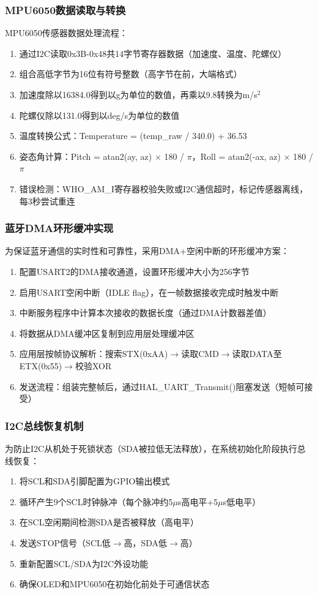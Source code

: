 \subsubsection{MPU6050数据读取与转换}
MPU6050传感器数据处理流程：
\begin{enumerate}
    \item 通过I2C读取0x3B-0x48共14字节寄存器数据（加速度、温度、陀螺仪）
    \item 组合高低字节为16位有符号整数（高字节在前，大端格式）
    \item 加速度除以16384.0得到以g为单位的数值，再乘以9.8转换为m/s$^2$
    \item 陀螺仪除以131.0得到以deg/s为单位的数值
    \item 温度转换公式：Temperature = (temp\_raw / 340.0) + 36.53
    \item 姿态角计算：Pitch = atan2(ay, az) $\times$ 180 / $\pi$，Roll = atan2(-ax, az) $\times$ 180 / $\pi$
    \item 错误检测：WHO\_AM\_I寄存器校验失败或I2C通信超时，标记传感器离线，每3秒尝试重连
\end{enumerate}

\subsubsection{蓝牙DMA环形缓冲实现}
为保证蓝牙通信的实时性和可靠性，采用DMA+空闲中断的环形缓冲方案：
\begin{enumerate}
    \item 配置USART2的DMA接收通道，设置环形缓冲大小为256字节
    \item 启用USART空闲中断（IDLE flag），在一帧数据接收完成时触发中断
    \item 中断服务程序中计算本次接收的数据长度（通过DMA计数器差值）
    \item 将数据从DMA缓冲区复制到应用层处理缓冲区
    \item 应用层按帧协议解析：搜索STX(0xAA)$\rightarrow$读取CMD$\rightarrow$读取DATA至ETX(0x55)$\rightarrow$校验XOR
    \item 发送流程：组装完整帧后，通过HAL\_UART\_Transmit()阻塞发送（短帧可接受）
\end{enumerate}

\subsubsection{I2C总线恢复机制}
为防止I2C从机处于死锁状态（SDA被拉低无法释放），在系统初始化阶段执行总线恢复：
\begin{enumerate}
    \item 将SCL和SDA引脚配置为GPIO输出模式
    \item 循环产生9个SCL时钟脉冲（每个脉冲约5$\mu$s高电平+5$\mu$s低电平）
    \item 在SCL空闲期间检测SDA是否被释放（高电平）
    \item 发送STOP信号（SCL低$\rightarrow$高，SDA低$\rightarrow$高）
    \item 重新配置SCL/SDA为I2C外设功能
    \item 确保OLED和MPU6050在初始化前处于可通信状态
\end{enumerate}

